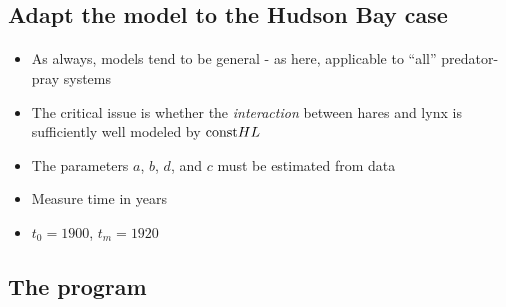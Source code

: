 \documentclass[%
oneside,                 %
final,                   %
10pt]{article}
\begin{document}
\noindent



\subsection*{Adapt the model to the Hudson Bay case}


\paragraph{}
\begin{itemize}
 \item As always, models tend to be general - as here, applicable
   to ``all'' predator-pray systems

 \item The critical issue is whether the \emph{interaction} between hares and lynx
   is sufficiently well modeled by $\hbox{const}HL$

 \item The parameters $a$, $b$, $d$, and $c$ must be
   estimated from data

 \item Measure time in years

 \item $t_0=1900$, $t_m=1920$
\end{itemize}

\noindent



\subsection*{The program}


\end{document}

